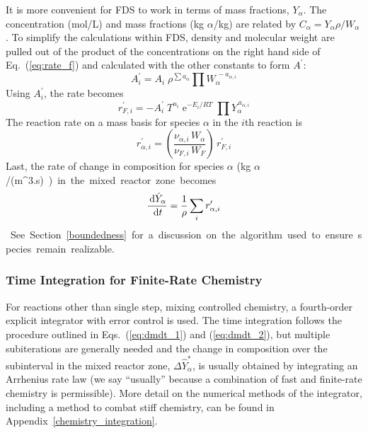 It is more convenient for FDS to work in terms of mass fractions, $Y_{\alpha}$.  The concentration (mol/L) and mass fractions (kg $\alpha$/kg) are related by $C_{\alpha}=Y_{\alpha} \rho/W_{\alpha}$.
To simplify the calculations within FDS, density and molecular weight are pulled out of the product of the concentrations on the right hand side of Eq.~(\ref{eq:rate_f}) and calculated with the other constants to form $A^{\prime}$:
\begin{equation}\label{eq:aprime}
A^{\prime}_{i} = A_{i}\;\rho^{\sum a_{\alpha}}\prod W_{\alpha}^{\,-a_{\alpha,i}}
\end{equation}
Using $A_i^{\prime}$, the rate becomes
\begin{equation}\label{eq:finite_rate_fin}
r^{\prime}_{F,i} = -A_i^{\prime}\;T^{n_i}\;\mathrm{e}^{-E_i/RT}\;\prod Y_{\alpha}^{\,a_{\alpha,i}}
\end{equation}
The reaction rate on a mass basis for species $\alpha$ in the $i$th reaction is
\begin{equation}\label{eq:rate_a_y}
r^{\prime}_{\alpha,i}= \left(\frac{\nu_{\alpha,i}\,W_{\alpha}}{\nu_{F,i}\,W_{F}}\right)\,r^{\prime}_{F,i}
\end{equation}
Last, the rate of change in composition for species $\alpha$ (\si{kg $\alpha$/(m^3.s)}) in the mixed reactor zone becomes
\begin{equation}\label{rate_expression_y}
\frac{\,\mathrm{d} \hat{Y}_{\alpha}}{\,\mathrm{d} t} = \frac{1}{\rho}\sum_{i} r^{\prime}_{\alpha,i}
\end{equation}
See Section \ref{boundedness} for a discussion on the algorithm used to ensure species remain realizable.

\subsubsection{Time Integration for Finite-Rate Chemistry}

For reactions other than single step, mixing controlled chemistry, a fourth-order explicit integrator with error control is used. The time integration follows the procedure outlined in Eqs.~(\ref{eq:dmdt_1}) and (\ref{eq:dmdt_2}), but multiple subiterations are generally needed and the change in composition over the subinterval in the mixed reactor zone, $\Delta \hat{Y}_\alpha^*$, is usually obtained by integrating an Arrhenius rate law (we say ``usually'' because a combination of fast and finite-rate chemistry is permissible). More detail on the numerical methods of the integrator, including a method to combat stiff chemistry, can be found in Appendix~\ref{chemistry_integration}.

